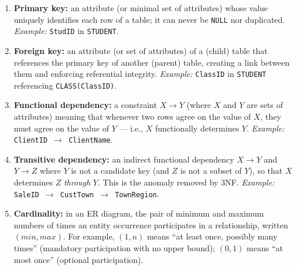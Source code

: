 \documentclass[11pt]{article}
\begin{document}
\begin{corrige}
\begin{enumerate}
\item \textbf{Primary key:} an attribute (or minimal set of attributes) whose value uniquely identifies each row of a table; it can never be \texttt{NULL} nor duplicated. \emph{Example:} \texttt{StudID} in \texttt{STUDENT}.
\item \textbf{Foreign key:} an attribute (or set of attributes) of a (child) table that references the primary key of another (parent) table, creating a link between them and enforcing referential integrity. \emph{Example:} \texttt{ClassID} in \texttt{STUDENT} referencing \texttt{CLASS(ClassID)}.
\item \textbf{Functional dependency:} a constraint $X \rightarrow Y$ (where $X$ and $Y$ are sets of attributes) meaning that whenever two rows agree on the value of $X$, they must agree on the value of $Y$ — i.e., $X$ functionally determines $Y$. \emph{Example:} \texttt{ClientID $\rightarrow$ ClientName}.
\item \textbf{Transitive dependency:} an indirect functional dependency $X \rightarrow Y$ and $Y \rightarrow Z$ where $Y$ is not a candidate key (and $Z$ is not a subset of $Y$), so that $X$ determines $Z$ \emph{through} $Y$. This is the anomaly removed by 3NF. \emph{Example:} \texttt{SaleID $\rightarrow$ CustTown $\rightarrow$ TownRegion}.
\item \textbf{Cardinality:} in an ER diagram, the pair of minimum and maximum numbers of times an entity occurrence participates in a relationship, written $(min, max)$. For example, $(1,n)$ means ``at least once, possibly many times'' (mandatory participation with no upper bound); $(0,1)$ means ``at most once'' (optional participation).
\end{enumerate}
\end{corrige}
\end{document}
